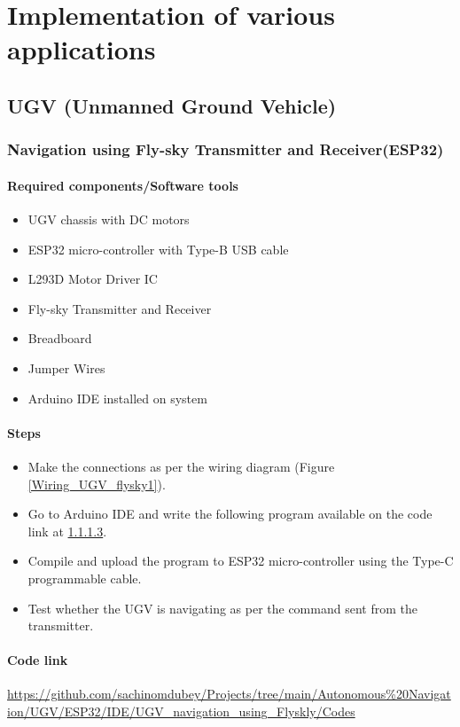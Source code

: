 \chapter{Implementation of various applications}
\section{UGV (Unmanned Ground Vehicle)}
\subsection{Navigation using Fly-sky Transmitter and Receiver(ESP32)} 
\subsubsection{Required components/Software tools}
\begin{itemize}
    \item  UGV chassis with DC motors
    \item  ESP32 micro-controller with Type-B USB cable
    \item  L293D Motor Driver IC
    \item  Fly-sky Transmitter and Receiver
    \item  Breadboard
    \item  Jumper Wires
    \item  Arduino IDE installed on system
\end{itemize}



\subsubsection{Steps}
\begin{itemize}
    \item Make the connections as per the wiring diagram (Figure \ref{Wiring_UGV_flysky1}).
    \item Go to Arduino IDE and write the following program available on the code link at \ref{Code_link_UGV_flysky}.
    \item Compile and upload the program to ESP32 micro-controller using the Type-C programmable cable. 
    \item Test whether the UGV is navigating as per the command sent from the transmitter.
\end{itemize}

\subsubsection{Code link} \label{Code_link_UGV_flysky}
\begin{tcolorbox}
\url{https://github.com/sachinomdubey/Projects/tree/main/Autonomous\%20Navigation/UGV/ESP32/IDE/UGV_navigation_using_Flyskly/Codes}
\end{tcolorbox}

